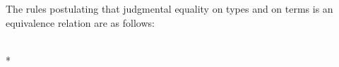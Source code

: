 \begin{samepage}
The rules postulating that judgmental equality on types and on terms is an equivalence relation are as follows:
\begin{center}
\begin{minipage}{.2\textwidth}
\begin{prooftree}
\end{prooftree}
\end{minipage}
\begin{minipage}{.25\textwidth}
\begin{prooftree}
\end{prooftree}
\end{minipage}
\begin{minipage}{.5\textwidth}
\begin{prooftree}
\end{prooftree}
\end{minipage}
\\*
\bigskip
\begin{minipage}{.2\textwidth}
\begin{prooftree}
\end{prooftree}
\end{minipage}
\begin{minipage}{.25\textwidth}
\begin{prooftree}
\end{prooftree}
\end{minipage}
\begin{minipage}{.5\textwidth}
\begin{prooftree}
\end{prooftree}
\end{minipage}
\end{center}
\end{samepage}

